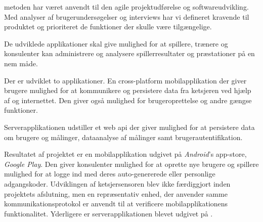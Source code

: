  metoden har været anvendt til den agile projektudførelse og softwareudvikling.
Med analyser af brugerundersøgelser og interviews har vi defineret kravende til produktet og prioriteret de funktioner der skulle være tilgængelige.

De udviklede applikationer skal give mulighed for at spillere, trænere og konsulenter kan administrere og analysere spillerresultater og præstationer på en nem måde.

Der er udviklet to applikationer.
En cross-platform mobilapplikation der giver brugere mulighed for at kommunikere og persistere data fra ketsjeren ved hjælp af  og internettet.
Den giver også mulighed for brugeroprettelse og andre gængse funktioner.

Serverapplikationen udstiller et web \gls{api} der giver mulighed for at persistere data om brugere og målinger, dataanalyse af målinger samt brugerautentifikation.

Resultatet af projektet er en mobilapplikation udgivet på \textit{Android}'s app-store, \textit{Google Play}.
Den giver konsulenter mulighed for at oprette nye brugere og spillere mulighed for at logge ind med deres auto-genererede eller personlige adgangskoder.
Udviklingen af ketsjersensoren blev ikke færdiggjort inden projektets afslutning, men en repræsentativ enhed, der anvender samme kommunikationsprotokol er anvendt til at verificere mobilapplikationens funktionalitet.
Yderligere er serverapplikationen blevet udgivet på .
